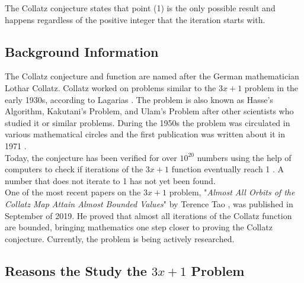 \documentclass[12pt,a4paper,reqno]{amsart}
\begin{document}
The Collatz conjecture states that point (1) is the only possible result and 
happens regardless of the positive integer that the iteration starts with.

\subsection{Background Information}

The Collatz conjecture and function are named after the German mathematician
Lothar Collatz. Collatz worked on problems similar to the $3x+1$ problem in the
early 1930s, according to Lagarias \cite{src:03}. The problem is also known as 
Hasse's Algorithm, Kakutani's Problem, and Ulam's Problem 
after other scientists who studied it or similar problems. During the 1950s 
the problem was circulated in various mathematical circles and the first 
publication was written about it in 1971 \cite{src:03}. \\
Today, the conjecture has been verified for over $10^{20}$ numbers using the 
help of computers to check if iterations of the $3x+1$ function eventually
reach 1 \cite{src:04}. A number that does not iterate to 1 has not yet been
found. \\
One of the most recent papers on the $3x+1$ problem, "\textit{Almost All Orbits
of the Collatz Map Attain Almost Bounded Values}" by Terence Tao \cite{src:04},
was published in September of 2019. He proved that almost all iterations of the
Collatz function are bounded, bringing mathematics one step closer to proving 
the Collatz conjecture. Currently, the problem is being actively researched.

\subsection{Reasons the Study the $3x+1$ Problem}
\end{document}
